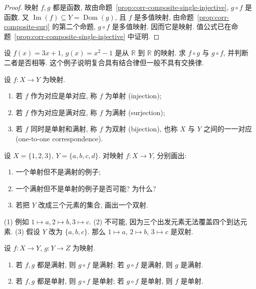 \documentclass[usesamecnt, thmcnt=section, lang=cn, newtx, 10pt, scheme=chinese]{elegantbook}
\begin{document}
\begin{proof}
映射 $f,g$ 都是函数, 故由命题~\ref{prop:corr-composite-single-injective}, $g\circ f$ 是函数. 又 $\operatorname{Im}(f)\subseteq Y=\operatorname{Dom}(g)$, 且 $f$ 是多值映射, 由命题~\ref{prop:corr-composite-surj} 的第二个命题, $g\circ f$ 是多值映射. 因而它是映射. 值公式已在命题~\ref{prop:corr-composite-single-injective} 中证明.
\end{proof}

\begin{exercise}\label{ex:corr-composition-mappings}
设 $f(x)=3x+1$, $g(x)=x^2-1$ 是从 $\mathbb R$ 到 $\mathbb R$ 的映射. 求 $f\circ g$ 与 $g\circ f$, 并判断二者是否相等. 这个例子说明复合具有结合律但一般不具有交换律.
\end{exercise}

\begin{definition}[单射、满射与双射]\label{def:corr-inj-surj-bij}
设 $f:X\to Y$ 为映射.
\begin{enumerate}[label=\rm(\arabic*)]
  \item 若 $f$ 作为对应是单对应, 称 $f$ 为{\color{blue}单射 (injection)};
  \item 若 $f$ 作为对应是满对应, 称 $f$ 为{\color{blue}满射 (surjection)};
  \item 若 $f$ 同时是单射和满射, 称 $f$ 为{\color{blue}双射 (bijection)}, 也称 $X$ 与 $Y$ 之间的{\color{blue}一一对应 (one-to-one correspondence)}.
\end{enumerate}
\end{definition}

\begin{concept}\label{con:corr-10}
设 $X=\{1,2,3\}$, $Y=\{a,b,c,d\}$. 对映射 $f:X\to Y$, 分别画出:
\begin{enumerate}[label=\rm(\arabic*)]
  \item 一个单射但不是满射的例子;
  \item 一个满射但不是单射的例子是否可能? 为什么?
  \item 若把 $Y$ 改成三个元素的集合, 画出一个双射.
\end{enumerate}
\end{concept}

\begin{solution}
(1) 例如 $1\mapsto a,2\mapsto b,3\mapsto c$. (2) 不可能, 因为三个出发元素无法覆盖四个到达元素. (3) 假设 $Y$ 改为 $\{a,b,c\}$. 那么 $1\mapsto a$, $2\mapsto b$, $3\mapsto c$ 是双射.
\end{solution}

\begin{proposition}\label{prop:corr-comp-inj-surj}
设 $f:X\to Y$, $g:Y\to Z$ 为映射.
\begin{enumerate}[label=\rm(\arabic*)]
  \item 若 $f,g$ 都是满射, 则 $g\circ f$ 是满射; 若 $g\circ f$ 是满射, 则 $g$ 是满射.
  \item 若 $f,g$ 都是单射, 则 $g\circ f$ 是单射; 若 $g\circ f$ 是单射, 则 $f$ 是单射.
\end{enumerate}
\end{proposition}
\end{document}
